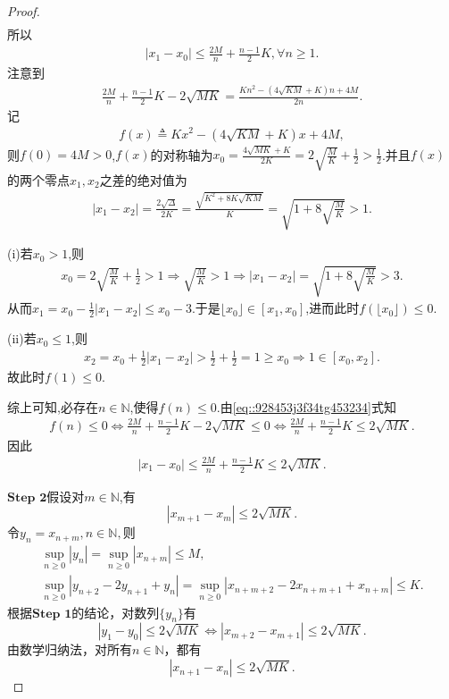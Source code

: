 \documentclass[../../main.tex]{subfiles}%
\begin{document}
\begin{proof}
\begin{align*}
\end{align*}
所以
\begin{align*}
|x_1 - x_0| \leqslant \frac{2M}{n} + \frac{n-1}{2}K, \forall n \geqslant 1.
\end{align*}
注意到
\begin{align}
\frac{2M}{n} + \frac{n-1}{2}K - 2\sqrt{MK} = \frac{Kn^2 - (4\sqrt{KM} + K)n + 4M}{2n}. \label{eq::928453j3f34tg453234}
\end{align}
记
\begin{align*}
f(x) \triangleq Kx^2 - (4\sqrt{KM} + K)x + 4M,
\end{align*}
则$f(0) = 4M > 0$,$f(x)$的对称轴为$x_0=\frac{4\sqrt{MK} + K}{2K} = 2\sqrt{\frac{M}{K}} + \frac{1}{2} > \frac{1}{2}$.并且$f(x)$的两个零点$x_1,x_2$之差的绝对值为
\begin{align*}
|x_1-x_2|=\frac{2\sqrt{\Delta}}{2K} = \frac{\sqrt{K^2 + 8K\sqrt{KM}}}{K} = \sqrt{1 + 8\sqrt{\frac{M}{K}}} > 1.
\end{align*}

(i)若$x_0>1$,则
\begin{align*}
x_0=2\sqrt{\frac{M}{K}}+\frac{1}{2}>1\Longrightarrow \sqrt{\frac{M}{K}}>1\Longrightarrow \left| x_1-x_2 \right|=\sqrt{1+8\sqrt{\frac{M}{K}}}>3.
\end{align*}
从而$x_1=x_0-\frac{1}{2}\left| x_1-x_2 \right|\leqslant x_0-3$.于是$\lfloor x_0 \rfloor \in \left[ x_1,x_0 \right]$,进而此时$f\left( \lfloor x_0 \rfloor \right) \leqslant 0$.

(ii)若$x_0\leqslant 1$,则
\begin{align*}
x_2=x_0+\frac{1}{2}\left| x_1-x_2 \right|>\frac{1}{2}+\frac{1}{2}=1\geqslant x_0\Longrightarrow 1\in \left[ x_0,x_2 \right].
\end{align*}
故此时$f\left( 1 \right) \leqslant 0$.

综上可知,必存在$n \in \mathbb{N}$,使得$f(n) \leqslant 0$.由\eqref{eq::928453j3f34tg453234}式知
\begin{align*}
f(n) \leqslant 0 \Longleftrightarrow \frac{2M}{n} + \frac{n-1}{2}K - 2\sqrt{MK} \leqslant 0 \Longleftrightarrow \frac{2M}{n} + \frac{n-1}{2}K \leqslant 2\sqrt{MK}.
\end{align*}
因此
\begin{align*}
|x_1 - x_0| \leqslant \frac{2M}{n} + \frac{n-1}{2}K \leqslant 2\sqrt{MK}.
\end{align*}

$\mathbf{Step}\,\,\mathbf{2}$假设对$m\in\mathbb{N}$,有
$$|x_{m+1}-x_m|\leqslant2\sqrt{MK}.$$
令$y_n = x_{n+m}, n\in \mathbb{N},$则
\begin{gather*}
\mathop {\mathrm{sup}} \limits_{n\geqslant 0}\left| y_n \right|=\mathop {\mathrm{sup}} \limits_{n\geqslant 0}\left| x_{n+m} \right|\leqslant M,
\\
\mathop {\mathrm{sup}} \limits_{n\geqslant 0}\left| y_{n+2}-2y_{n+1}+y_n \right|=\mathop {\mathrm{sup}} \limits_{n\geqslant 0}\left| x_{n+m+2}-2x_{n+m+1}+x_{n+m} \right|\leqslant K.
\end{gather*}
根据$\mathbf{Step}\,\,\mathbf{1}$的结论，对数列$\{y_n\}$有
$$
|y_1-y_0|\leqslant2\sqrt{MK}\iff |x_{m+2}-x_{m+1}|\leqslant2\sqrt{MK}.
$$
由数学归纳法，对所有$n\in\mathbb{N}$，都有
$$|x_{n+1}-x_n|\leqslant2\sqrt{MK}.$$


\end{proof}
\end{document}
